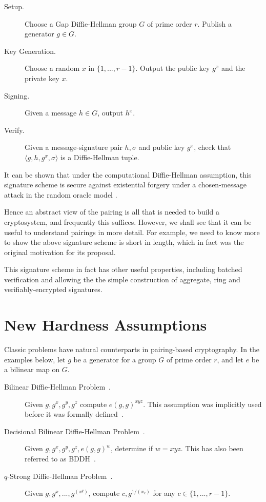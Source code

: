 \begin{description}
\item[Setup.]
Choose a Gap Diffie-Hellman group $G$ of prime order $r$.
Publish a generator $g \in G$.

\item[Key Generation.]
Choose a random $x$ in $\{1,...,r-1\}$. Output
the public key $g^x$ and the private key $x$.

\item[Signing.]
Given a message $h \in G$, output $h^x$.

\item[Verify.]
Given a message-signature pair $h, \sigma$ and public key $g^x$,
check that $\langle{ g, h, g^x, \sigma}\rangle$ is a Diffie-Hellman tuple.
\end{description}

It can be shown that under the computational Diffie-Hellman assumption,
this signature scheme is secure against existential
forgery under a chosen-message attack in the random oracle model \cite{bls}.

Hence an abstract view of the pairing is all that is needed to build a
cryptosystem, and frequently this suffices. However,
we shall see that it can be useful to understand pairings in more detail.
For example, we need to know more to show the above signature scheme is
short in length, which in fact was the original motivation for its proposal.

This signature scheme in fact has other useful properties, including
batched verification and allowing the
the simple construction of aggregate, ring and verifiably-encrypted
signatures\cite{bgls}.

\section{New Hardness Assumptions}

Classic problems have natural counterparts in pairing-based
cryptography. In the examples below, let $g$ be a generator
for a group $G$ of prime order $r$, and let $e$ be a bilinear map
on $G$.

\begin{description}
\item [Bilinear Diffie-Hellman Problem~\cite{bf}.]
Given $g,g^x,g^y,g^z$ compute $e(g,g)^{xyz}$. This assumption
was implicitly used before it was formally defined~\cite{sok, j}.
\item [Decisional Bilinear Diffie-Hellman Problem~\cite{bbibe}.]
Given $g,g^x,g^y,g^z,e(g,g)^w$, determine if $w = x y z$.
This has also been referred to as BDDH~\cite{bf}.
\item [$q$-Strong Diffie-Hellman Problem~\cite{bbshort}.]
Given $g,g^x,...,g^{(x^q)}$, compute $c, g^{1/(x_c)}$
for any $c\in\{1,...,r-1\}$.
\end{description}

